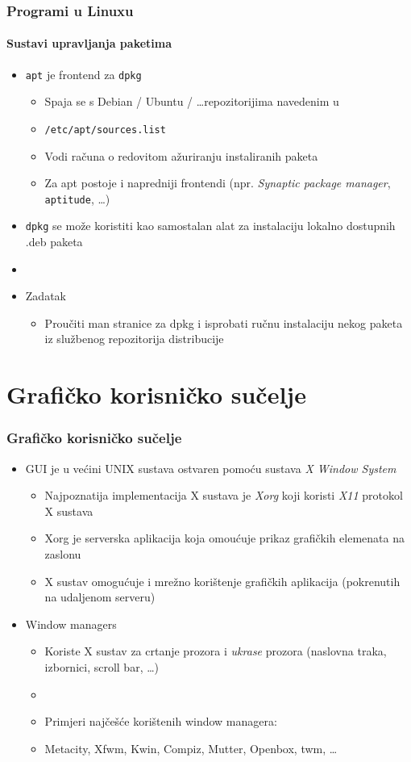 \documentclass[table,usenames,dvipsnames]{beamer}
\newcommand{\shell}[1]{\texttt{#1}}
\begin{document}
\begin{frame}[t]
	\frametitle{Programi u Linuxu}
	\framesubtitle{Sustavi upravljanja paketima}
	\begin{itemize}
		\item \shell{apt} je frontend za \shell{dpkg}
		\begin{itemize}
			\item Spaja se s Debian / Ubuntu / \ldots repozitorijima navedenim u
			\item[] \shell{/etc/apt/sources.list}
			\item Vodi računa o redovitom ažuriranju instaliranih paketa
			\item Za apt postoje i napredniji frontendi (npr. \emph{Synaptic package manager}, \shell{aptitude}, \ldots)
		\end{itemize}
		\item \shell{dpkg} se može koristiti kao samostalan alat za instalaciju lokalno dostupnih .deb paketa
		\item[]
		\item Zadatak
		\begin{itemize}
			\item Proučiti man stranice za dpkg i isprobati ručnu instalaciju nekog paketa iz službenog repozitorija distribucije
		\end{itemize}
	\end{itemize}
\end{frame}

\section{Grafičko korisničko sučelje}
\begin{frame}[t]
	\frametitle{Grafičko korisničko sučelje}
	\begin{itemize}
		\item GUI je u većini UNIX sustava ostvaren pomoću sustava \emph{X Window System}
		\begin{itemize}
			\item Najpoznatija implementacija X sustava je \emph{Xorg} koji koristi \emph{X11} protokol X sustava
			\item Xorg je serverska aplikacija koja omoućuje prikaz grafičkih elemenata na zaslonu
			\item X sustav omogućuje i mrežno korištenje grafičkih aplikacija (pokrenutih na udaljenom serveru)
		\end{itemize}
		\item Window managers
		\begin{itemize}
			\item Koriste X sustav za crtanje prozora i \textit{ukrase} prozora (naslovna traka, izbornici, scroll bar, \ldots)
			\item[]
			\item Primjeri najčešće korištenih window managera:
			\item[] Metacity, Xfwm, Kwin, Compiz, Mutter, Openbox, twm, \ldots
		\end{itemize}
	\end{itemize}
\end{frame}
\end{document}
